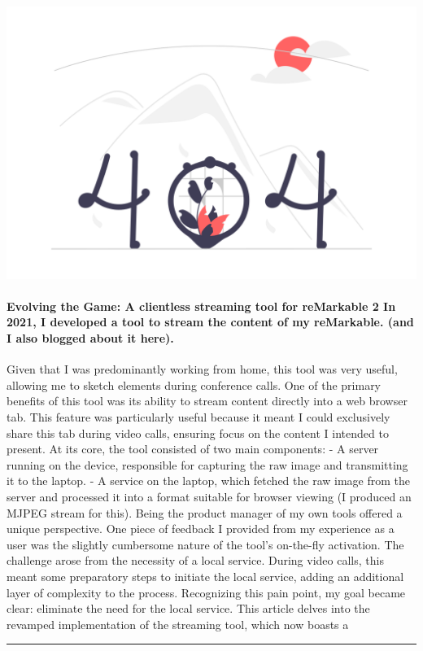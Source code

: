\documentclass[10pt,a4paper]{article}
\begin{document}
\begin{minipage}[t]{0.80\linewidth}
\vspace{0pt}
\begin{multicols}{2}

    \href{https://blog.owulveryck.info/2023/07/25/evolving-the-game-a-clientless-streaming-tool-for-remarkable-2.html?utm\_source=hackernewsletter\&utm\_medium=email\&utm\_term=fav}{
        \includegraphics[width=0.99\linewidth]{notfound.png}
    }
  
\paragraph{Evolving the Game: A clientless streaming tool for reMarkable 2
In 2021, I developed a tool to stream the content of my reMarkable. (and I also blogged about it here).}
 Given that I was predominantly working from home, this tool was very useful, allowing me to sketch elements during conference calls.
One of the primary benefits of this tool was its ability to stream content directly into a web browser tab. This feature was particularly useful because it meant I could exclusively share this tab during video calls, ensuring focus on the content I intended to present.
At its core, the tool consisted of two main components:
- A server running on the device, responsible for capturing the raw image and transmitting it to the laptop.
- A service on the laptop, which fetched the raw image from the server and processed it into a format suitable for browser viewing (I produced an MJPEG stream for this).
Being the product manager of my own tools offered a unique perspective. One piece of feedback I provided from my experience as a user was the slightly cumbersome nature of the tool’s on-the-fly activation. The challenge arose from the necessity of a local service. During video calls, this meant some preparatory steps to initiate the local service, adding an additional layer of complexity to the process.
Recognizing this pain point, my goal became clear: eliminate the need for the local service. This article delves into the revamped implementation of the streaming tool, which now boasts a

\end{multicols}
\end{minipage}
\par\medskip
\noindent\textcolor{red}{\rule{\linewidth}{0.2mm}}
\end{document}
